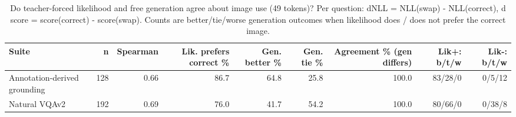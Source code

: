 \begin{table}[t]
\centering
\small
\caption{Do teacher-forced likelihood and free generation agree about image use (49 tokens)? Per question: dNLL = NLL(swap) - NLL(correct), d score = score(correct) - score(swap). Counts are better/tie/worse generation outcomes when likelihood does / does not prefer the correct image.}
\label{tab:t2_t7_likelihood_vs_generation_compress49}
\begin{tabular}{lrrrrrrrr}
\toprule
Suite & n & Spearman & Lik. prefers correct \% & Gen. better \% & Gen. tie \% & Agreement \% (gen differs) & Lik+: b/t/w & Lik-: b/t/w \\
\midrule
Annotation-derived grounding & 128 & 0.66 & 86.7 & 64.8 & 25.8 & 100.0 & 83/28/0 & 0/5/12 \\
Natural VQAv2 & 192 & 0.69 & 76.0 & 41.7 & 54.2 & 100.0 & 80/66/0 & 0/38/8 \\
\bottomrule
\end{tabular}
\end{table}
